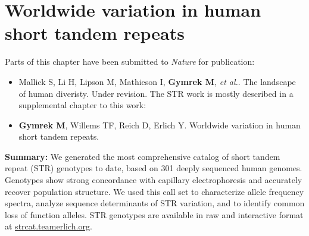 \chapter{Worldwide variation in human short tandem repeats}

\label{chap:sgdp}

\hzline

Parts of this chapter have been submitted to \emph{Nature} for publication:
\begin{itemize}
\item[] Mallick S, Li H, Lipson M, Mathieson I, \textbf{Gymrek M}, \emph{et al.}. The landscape of human diveristy. Under revision. The STR work is mostly described in a supplemental chapter to this work:
\item[] \textbf{Gymrek M}, Willems TF, Reich D, Erlich Y. Worldwide variation in human short tandem repeats. 
\end{itemize}
\hzline

\textbf{Summary:} We generated the most comprehensive catalog of short tandem repeat (STR) genotypes to date, based on 301 deeply sequenced human genomes. Genotypes show strong concordance with capillary electrophoresis and accurately recover population structure. We used this call set to characterize allele frequency spectra, analyze sequence determinants of STR variation, and to identify common loss of function alleles. STR genotypes are available in raw and interactive format at \url{strcat.teamerlich.org}.

